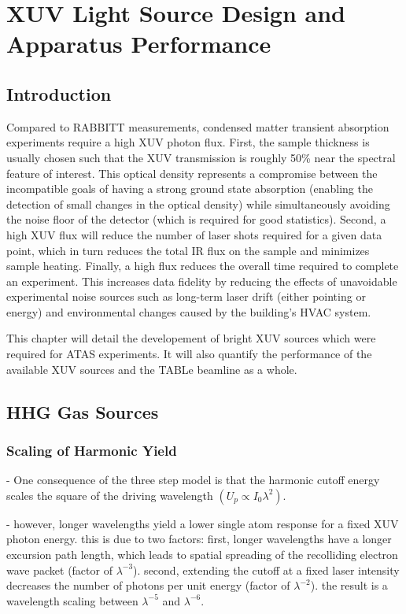 \chapter{XUV Light Source Design and Apparatus Performance}

\section{Introduction}

Compared to RABBITT measurements, condensed matter transient absorption experiments require a high XUV photon flux. First, the sample thickness is usually chosen such that the XUV transmission is roughly 50\% near the spectral feature of interest. This optical density represents a compromise between the incompatible goals of having a strong ground state absorption (enabling the detection of small changes in the optical density) while simultaneously avoiding the noise floor of the detector (which is required for good statistics). Second, a high XUV flux will reduce the number of laser shots required for a given data point, which in turn reduces the total IR flux on the sample and minimizes sample heating. Finally, a high flux reduces the overall time required to complete an experiment. This increases data fidelity by reducing the effects of unavoidable experimental noise sources such as long-term laser drift (either pointing or energy) and environmental changes caused by the building's HVAC system.

This chapter will detail the developement of bright XUV sources which were required for ATAS experiments. It will also quantify the performance of the available XUV sources and the TABLe beamline as a whole.

\section{HHG Gas Sources}

\subsection{Scaling of Harmonic Yield}

- One consequence of the three step model is that the harmonic cutoff energy scales the square of the driving wavelength $(U_p \propto I_0 \lambda^2)$.

- however, longer wavelengths yield a lower single atom response for a fixed XUV photon energy. this is due to two factors: first, longer wavelengths have a longer excursion path length, which leads to spatial spreading of the recolliding electron wave packet (factor of $\lambda^{-3}$). second, extending the cutoff at a fixed laser intensity decreases the number of photons per unit energy (factor of $\lambda^{-2}$). the result is a wavelength scaling between $\lambda^{-5}$ and $\lambda^{-6}$.

